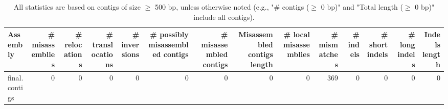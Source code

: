\documentclass[12pt,a4paper]{article}
\begin{document}
\begin{table}[ht]
\begin{center}
\caption{All statistics are based on contigs of size $\geq$ 500 bp, unless otherwise noted (e.g., "\# contigs ($\geq$ 0 bp)" and "Total length ($\geq$ 0 bp)" include all contigs).}
\begin{tabular}{|l*{13}{|r}|}
\hline
Assembly & \# misassemblies &     \# relocations &     \# translocations &     \# inversions & \# possibly misassembled contigs & \# misassembled contigs & Misassembled contigs length & \# local misassemblies & \# mismatches & \# indels &     \# short indels &     \# long indels & Indels length \\ \hline
final.contigs & 0 & 0 & 0 & 0 & 0 & 0 & 0 & 0 & 369 & 0 & 0 & 0 & 0 \\ \hline
\end{tabular}
\end{center}
\end{table}
\end{document}
